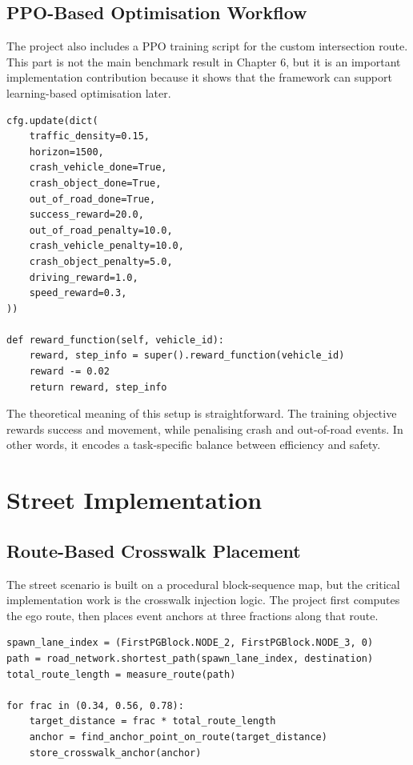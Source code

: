 \documentclass[12pt,a4paper]{report}
\begin{document}
\subsection{PPO-Based Optimisation Workflow}
The project also includes a PPO training script for the custom intersection route. This part is not the main benchmark result in Chapter 6, but it is an important implementation contribution because it shows that the framework can support learning-based optimisation later.

\begin{lstlisting}[caption={Main reward and configuration logic for the PPO training workflow.},label={lst:ppo_logic},float=H]
cfg.update(dict(
    traffic_density=0.15,
    horizon=1500,
    crash_vehicle_done=True,
    crash_object_done=True,
    out_of_road_done=True,
    success_reward=20.0,
    out_of_road_penalty=10.0,
    crash_vehicle_penalty=10.0,
    crash_object_penalty=5.0,
    driving_reward=1.0,
    speed_reward=0.3,
))

def reward_function(self, vehicle_id):
    reward, step_info = super().reward_function(vehicle_id)
    reward -= 0.02
    return reward, step_info
\end{lstlisting}

The theoretical meaning of this setup is straightforward. The training objective rewards success and movement, while penalising crash and out-of-road events. In other words, it encodes a task-specific balance between efficiency and safety.

\section{Street Implementation}

\subsection{Route-Based Crosswalk Placement}
The street scenario is built on a procedural block-sequence map, but the critical implementation work is the crosswalk injection logic. The project first computes the ego route, then places event anchors at three fractions along that route.

\begin{lstlisting}[caption={Concept of the route-based crosswalk injection logic.},label={lst:crosswalk_injection},float=H]
spawn_lane_index = (FirstPGBlock.NODE_2, FirstPGBlock.NODE_3, 0)
path = road_network.shortest_path(spawn_lane_index, destination)
total_route_length = measure_route(path)

for frac in (0.34, 0.56, 0.78):
    target_distance = frac * total_route_length
    anchor = find_anchor_point_on_route(target_distance)
    store_crosswalk_anchor(anchor)
\end{lstlisting}
\end{document}
